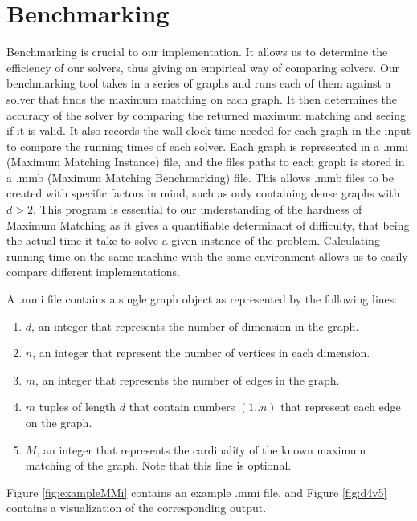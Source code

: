 \section{Benchmarking} \label{BenchmarkingSummary}
Benchmarking is crucial to our implementation. It allows us to determine the efficiency 
of our solvers, thus giving an empirical way of comparing solvers. 
Our benchmarking tool takes in a series of graphs and runs each of them against a solver that
finds the maximum matching on each graph.
It then determines the accuracy of the solver by comparing the returned maximum matching and 
seeing if it is valid. It also records the wall-clock time needed for each graph
in the input to compare the running times of each solver. Each graph is represented 
in a .mmi (Maximum Matching Instance) file, and the files paths to each graph 
is stored in a .mmb (Maximum Matching Benchmarking) file. This allows .mmb files to be created
with specific factors in mind, such as only containing dense graphs with $d > 2$. This program
is essential to our understanding of the hardness of Maximum Matching as it gives a 
quantifiable determinant of difficulty, that being the actual time it take to solve a given 
instance of the problem. Calculating running time on the same machine with the same environment
allows us to easily compare different implementations. 

A .mmi file contains a single graph object as represented by the following lines:
\begin{enumerate}
	\item $d$, an integer that represents the number of dimension in the graph. 
	\item $n$, an integer that represent the number of vertices in each dimension.
	\item $m$, an integer that represents the number of edges in the graph.
	\item $m$ tuples of length $d$ that contain numbers $(1..n)$ that represent
	each edge on the graph.
	\item $M$, an integer that represents the cardinality of the known maximum matching 
    of the graph. Note that this line is optional.
\end{enumerate}
Figure \ref{fig:exampleMMi} contains an example .mmi file, and Figure \ref{fig:d4v5} contains 
a visualization of the corresponding output.


